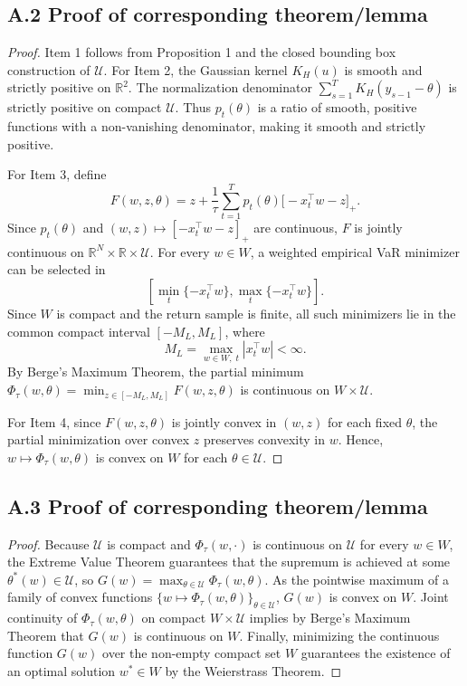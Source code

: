 \documentclass[smallextended]{svjour3}
\begin{document}
\subsection*{A.2 Proof of corresponding theorem/lemma}
\begin{proof}
Item 1 follows from Proposition 1 and the closed bounding box construction of $\mathcal{U}$. For Item 2, the Gaussian kernel $K_H(u)$ is smooth and strictly positive on $\mathbb{R}^2$. The normalization denominator $\sum_{s=1}^T K_H(y_{s-1} - \theta)$ is strictly positive on compact $\mathcal{U}$. Thus $p_t(\theta)$ is a ratio of smooth, positive functions with a non-vanishing denominator, making it smooth and strictly positive.

For Item 3, define
\begin{equation}
F(w,z,\theta) = z+\frac{1}{\tau}\sum_{t=1}^{T} p_t(\theta)\big[-x_t^\top w-z\big]_+.
\end{equation}
Since $p_t(\theta)$ and $(w,z)\mapsto[-x_t^\top w-z]_+$ are continuous, $F$ is jointly continuous on $\mathbb R^N\times\mathbb R\times\mathcal{U}$. For every $w\in W$, a weighted empirical VaR minimizer can be selected in
\begin{equation}
\left[\min_t\{-x_t^\top w\},\max_t\{-x_t^\top w\}\right].
\end{equation}
Since $W$ is compact and the return sample is finite, all such minimizers lie in the common compact interval $[-M_L,M_L]$, where
\begin{equation}
M_L=\max_{w\in W,\;t}|x_t^\top w|<\infty.
\end{equation}
By Berge's Maximum Theorem, the partial minimum $\Phi_\tau(w, \theta) = \min_{z \in [-M_L, M_L]} F(w, z, \theta)$ is continuous on $W \times \mathcal{U}$.

For Item 4, since $F(w, z, \theta)$ is jointly convex in $(w, z)$ for each fixed $\theta$, the partial minimization over convex $z$ preserves convexity in $w$. Hence, $w \mapsto \Phi_\tau(w, \theta)$ is convex on $W$ for each $\theta \in \mathcal{U}$.
\end{proof}

\subsection*{A.3 Proof of corresponding theorem/lemma}
\begin{proof}
Because $\mathcal{U}$ is compact and $\Phi_\tau(w, \cdot)$ is continuous on $\mathcal{U}$ for every $w \in W$, the Extreme Value Theorem guarantees that the supremum is achieved at some $\theta^*(w) \in \mathcal{U}$, so $G(w) = \max_{\theta \in \mathcal{U}} \Phi_\tau(w, \theta)$. As the pointwise maximum of a family of convex functions $\{w \mapsto \Phi_\tau(w, \theta)\}_{\theta \in \mathcal{U}}$, $G(w)$ is convex on $W$. Joint continuity of $\Phi_\tau(w, \theta)$ on compact $W \times \mathcal{U}$ implies by Berge's Maximum Theorem that $G(w)$ is continuous on $W$. Finally, minimizing the continuous function $G(w)$ over the non-empty compact set $W$ guarantees the existence of an optimal solution $w^* \in W$ by the Weierstrass Theorem.
\end{proof}
\end{document}
